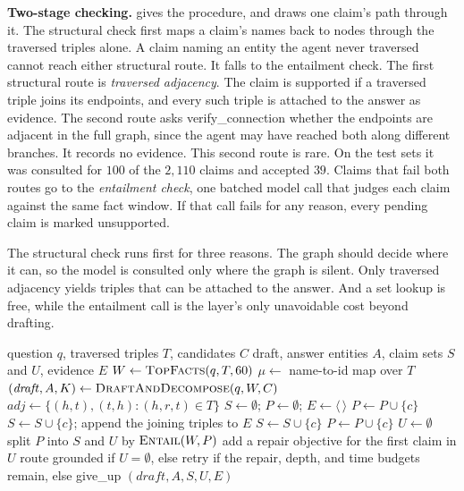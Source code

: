 \textbf{Two-stage checking.}  gives the procedure, and
 draws one claim's path through it. The structural check first
maps a claim's names back to nodes through the traversed triples alone. A claim
naming an entity the agent never traversed cannot reach either structural route.
It falls to the entailment check. The first structural route is \emph{traversed
adjacency}. The claim is supported if a traversed triple joins its endpoints,
and every such triple is attached to the answer as evidence. The second route
asks \textsf{verify\_connection} whether the endpoints are adjacent in the full
graph, since the agent may have reached both along different branches. It
records no evidence. This second route is rare. On the test sets it was
consulted for $100$ of the $2{,}110$ claims and accepted $39$. Claims that fail
both routes go to the \emph{entailment check}, one batched model call that
judges each claim against the same fact window. If that call fails for any
reason, every pending claim is marked unsupported.

The structural check runs first for three reasons. The graph should decide where
it can, so the model is consulted only where the graph is silent. Only traversed
adjacency yields triples that can be attached to the answer. And a set lookup is
free, while the entailment call is the layer's only unavoidable cost beyond
drafting.

\begin{algorithm}[!t]
\caption{Structural verification of a draft}
\label{alg:verify}
\small
\begin{algorithmic}[1]
\REQUIRE question $q$, traversed triples $T$, candidates $C$
\ENSURE draft, answer entities $A$, claim sets $S$ and $U$, evidence $E$
\STATE $W \gets \textsc{TopFacts}(q, T, 60)$
\STATE $\mu \gets$ name-to-id map over $T$
\STATE $(\mathit{draft}, A, K) \gets \textsc{DraftAndDecompose}(q, W, C)$
\STATE $\mathit{adj} \gets \{(h,t),(t,h) : (h,r,t) \in T\}$
\STATE $S \gets \emptyset$; $P \gets \emptyset$; $E \gets \langle\,\rangle$
    \STATE $P \gets P \cup \{c\}$ 
    \STATE $S \gets S \cup \{c\}$; append the joining triples to $E$
    \STATE $S \gets S \cup \{c\}$ 
  \ELSE
    \STATE $P \gets P \cup \{c\}$
  \ENDIF
\ENDFOR
\STATE $U \gets \emptyset$
  \STATE split $P$ into $S$ and $U$ by $\textsc{Entail}(W, P)$
\ENDIF
{}
  \STATE add a repair objective for the first claim in $U$
\ENDIF
\STATE route \textsf{grounded} if $U = \emptyset$, else \textsf{retry}
  if the repair, depth, and time budgets remain, else \textsf{give\_up}
\RETURN $(\mathit{draft}, A, S, U, E)$
\end{algorithmic}
\end{algorithm}

